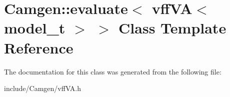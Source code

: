 \hypertarget{a00206}{\section{Camgen\-:\-:evaluate$<$ vff\-V\-A$<$ model\-\_\-t $>$ $>$ Class Template Reference}
\label{a00206}
}


The documentation for this class was generated from the following file\-:\begin{DoxyCompactItemize}
\item 
include/\-Camgen/vff\-V\-A.\-h\end{DoxyCompactItemize}
